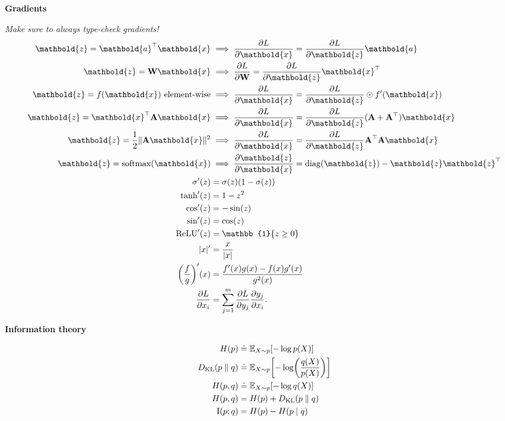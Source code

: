 \documentclass[10pt]{article}
\newenvironment{subtopic}[1]
{\vspace{0.1cm} \begin{center}\textbf{\footnotesize \sffamily #1}\end{center}}
{}
\renewcommand{\mat}[1]{\ensuremath{\mathbf{#1}}}
\renewcommand{\vec}[1]{\ensuremath{\mathbold{#1}}}
\begin{document}
\begin{multicols*}{3}
    \begin{subtopic}{Gradients}
        \textit{Make sure to always type-check gradients!}
        \begin{align*}
            \vec{z} = \transpose{\vec{a}} \vec{x} & \implies \pdv{L}{\vec{x}} = \pdv{L}{\vec{z}} \vec{a} \\
            \vec{z} = \mat{W} \vec{x} & \implies \pdv{L}{\mat{W}} = \pdv{L}{\vec{z}} \transpose{\vec{x}} \\
            \vec{z} = f(\vec{x}) \text{ element-wise} & \implies \pdv{L}{\vec{x}} = \pdv{L}{\vec{z}} \odot f'(\vec{x})   \\
            \vec{z} = \transpose{\vec{x}}\mat{A}\vec{x} & \implies \pdv{L}{\vec{x}} = \pdv{L}{\vec{z}} (\mat{A}+\transpose{\mat{A}})\vec{x} \\
            \vec{z} = \frac{1}{2} \| \mat{A} \vec{x} \|^2 & \implies \pdv{L}{\vec{x}} = \pdv{L}{\vec{z}} \transpose{\mat{A}} \mat{A} \vec{x} \\
            \vec{z} = \mathrm{softmax}(\vec{x}) & \implies \pdv{\vec{z}}{\vec{x}} = \mathrm{diag}(\vec{z}) - \vec{z}\transpose{\vec{z}} \\
            \sigma'(z) & = \sigma(z) (1-\sigma(z)) \\
            \tanh'(z) & = 1 - z^2 \\
            \cos'(z) & = -\sin(z) \\
            \sin'(z) & = \cos(z) \\
            \mathrm{ReLU}'(z) & = \mathbb{1}\{ z \geq 0 \} \\
            |x|' & = \frac{x}{|x|} \\
            \lft( \frac{f}{g} \rgt)'(x) & = \frac{f'(x) g(x) - f(x) g'(x)}{g^2(x)} \\
            \pdv{L}{x_i} & = \sum_{j=1}^{m} \pdv{L}{y_j} \pdv{y_j}{x_i}.
        \end{align*}
    \end{subtopic}

    \begin{subtopic}{Information theory}
        \begin{align*}
            H(p) & \doteq \E_{X \sim p}[-\log p(X)] \\
            D_{\mathrm{KL}}(p\;\|\;q) & \doteq \E_{X \sim p}\lft[ -\log \lft( \frac{q(X)}{p(X)} \rgt) \rgt] \\
            H(p, q) & \doteq \E_{X \sim p}[-\log q(X)] \\
            H(p, q) & = H(p) + D_{\mathrm{KL}}(p\;\|\;q) \\
            \mathrm{I}(p; q) & = H(p) - H(p \mid q) \\
        \end{align*}
    \end{subtopic}


\end{multicols*}
\end{document}
